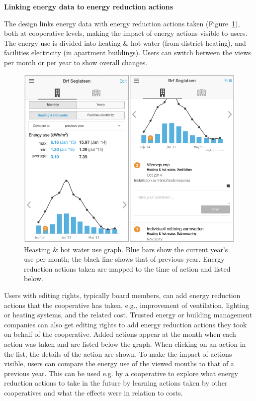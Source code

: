 \textbf{Linking energy data to energy reduction actions}

The design links energy data with energy reduction actions taken (Figure~\ref{fig:Figure201_Actions}), both at cooperative levels, making the impact of energy actions visible to users. The energy use is divided into heating \& hot water (from district heating), and facilities electricity (in apartment buildings). Users can switch between the views per month or per year to show overall changes. %
%
\begin{figure}[h!]
	\centering
	\includegraphics[width=.9\linewidth]{img/Figure201_Actions.png}
	\caption{Heasting \& hot water use graph. Blue bars show the current year's use per month; the black line shows that of previous year. Energy reduction actions taken are mapped to the time of action and listed below.}
	\label{fig:Figure201_Actions}
\end{figure}
%
Users with editing rights, typically board members, can  add energy reduction actions that the cooperative has taken, e.g., improvement of ventilation, lighting or heating systems, 
and the related cost.
Trusted energy or building management companies can also get editing rights to add energy reduction actions they took on behalf of the cooperative. 
Added actions appear at the month when each action was taken and are listed below the graph. When clicking on an action in the list, the details of the action are shown.
% 
To make the impact of actions visible, users can compare the energy use of the viewed months to that of a previous year. This can be used e.g. by a cooperative to explore what energy reduction actions to take in the future by learning actions taken by other cooperatives and what the effects were in relation to costs.\\

